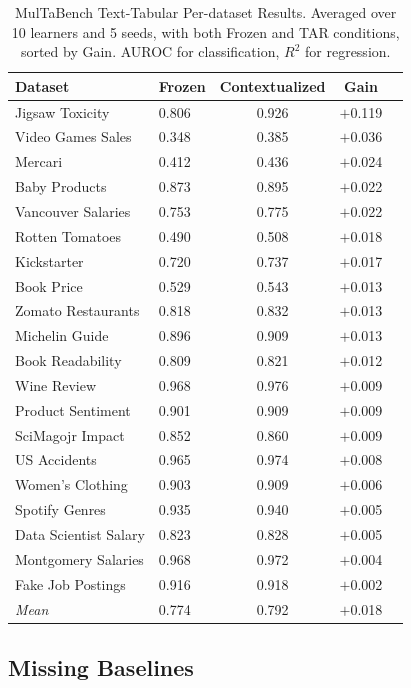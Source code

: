 \documentclass{llmxive}
\begin{document}
\begin{table}[ht]
\centering
\small
\begin{tabular}{llccc}
\toprule
Dataset & Frozen & Contextualized & Gain \\
\midrule
Jigsaw Toxicity & 0.806 & 0.926 & $+$0.119 \\
Video Games Sales & 0.348 & 0.385 & $+$0.036 \\
Mercari & 0.412 & 0.436 & $+$0.024 \\
Baby Products & 0.873 & 0.895 & $+$0.022 \\
Vancouver Salaries & 0.753 & 0.775 & $+$0.022 \\
Rotten Tomatoes & 0.490 & 0.508 & $+$0.018 \\
Kickstarter & 0.720 & 0.737 & $+$0.017 \\
Book Price & 0.529 & 0.543 & $+$0.013 \\
Zomato Restaurants & 0.818 & 0.832 & $+$0.013 \\
Michelin Guide & 0.896 & 0.909 & $+$0.013 \\
Book Readability & 0.809 & 0.821 & $+$0.012 \\
Wine Review & 0.968 & 0.976 & $+$0.009 \\
Product Sentiment & 0.901 & 0.909 & $+$0.009 \\
SciMagojr Impact & 0.852 & 0.860 & $+$0.009 \\
US Accidents & 0.965 & 0.974 & $+$0.008 \\
Women's Clothing & 0.903 & 0.909 & $+$0.006 \\
Spotify Genres & 0.935 & 0.940 & $+$0.005 \\
Data Scientist Salary & 0.823 & 0.828 & $+$0.005 \\
Montgomery Salaries & 0.968 & 0.972 & $+$0.004 \\
Fake Job Postings & 0.916 & 0.918 & $+$0.002 \\
\midrule
\textit{Mean} & 0.774 & 0.792 & $+$0.018 \\
\bottomrule
\end{tabular}
\caption{MulTaBench Text-Tabular Per-dataset Results. Averaged over 10 learners and 5 seeds, with both Frozen and TAR conditions, sorted by Gain. AUROC for classification, $R^2$ for regression.}
\label{tab:app_results_text}
\end{table}

\subsection{Missing Baselines}
\end{document}
